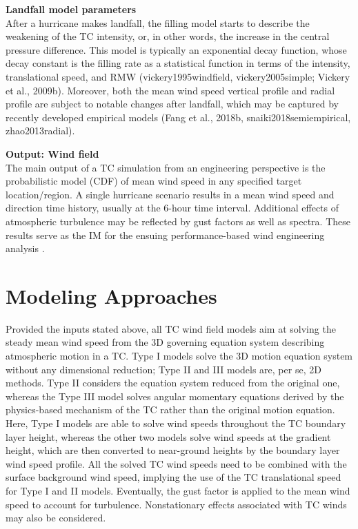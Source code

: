 \noindent\textbf{Landfall model parameters} \\After a hurricane makes landfall, the filling model starts to describe the weakening of the TC intensity, or, in other words, the increase in the central pressure difference. This model is typically an exponential decay function, whose decay constant is the filling rate as a statistical function in terms of the intensity, translational speed, and RMW (vickery1995windfield, vickery2005simple; Vickery et al., 2009b). Moreover, both the mean wind speed vertical profile and radial profile are subject to notable changes after landfall, which may be captured by recently developed empirical models (Fang et al., 2018b, snaiki2018semiempirical, zhao2013radial). 
\newline

\noindent\textbf{Output: Wind field} \\The main output of a TC simulation from an engineering perspective is the probabilistic model (CDF) of mean wind speed in any specified target location/region. A single hurricane scenario results in a mean wind speed and direction time history, usually at the 6-hour time interval. Additional effects of atmospheric turbulence may be reflected by gust factors as well as spectra. These results serve as the IM for the ensuing performance-based wind engineering analysis \citep{barbato2013performancebased, chuang2019efficient, liu2014projections, spence2014performancebased, unnikrishnan2016performancebased, xiao2011typhoon, yau2011hurricane}.

\section{Modeling Approaches}
\label{sec:storm_wind_methods}

Provided the inputs stated above, all TC wind field models aim at solving the steady mean wind speed from the 3D governing equation system describing atmospheric motion in a TC. Type I models solve the 3D motion equation system without any dimensional reduction; Type II and III models are, per se, 2D methods. Type II considers the equation system reduced from the original one, whereas the Type III model solves angular momentary equations derived by the physics-based mechanism of the TC rather than the original motion equation. Here, Type I models are able to solve wind speeds throughout the TC boundary layer height, whereas the other two models solve wind speeds at the gradient height, which are then converted to near-ground heights by the boundary layer wind speed profile. All the solved TC wind speeds need to be combined with the surface background wind speed, implying the use of the TC translational speed for Type I and II models. Eventually, the gust factor is applied to the mean wind speed to account for turbulence. Nonstationary effects associated with TC winds may also be considered.
\newline

